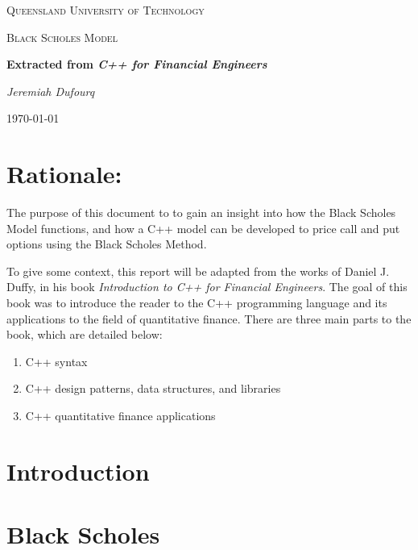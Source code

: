 \documentclass[12pt]{article}
\author{Jeremiah Dufourq}
\begin{document}
\begin{titlepage}
	\centering
	
	
	{\scshape\LARGE Queensland University of Technology \par}
	\vspace{5cm}
	{\scshape\Large Black Scholes Model\par}
	\vspace{1.5cm}
	{\huge\bfseries Extracted from \textit{C++ for Financial Engineers}\par}
	\vspace{2cm}
	{\Large\itshape Jeremiah Dufourq\par}
	
	{\large \today\par}
\end{titlepage}


\newpage
\tableofcontents
\newpage


\section{Rationale:}
The purpose of this document to to gain an insight into how the Black Scholes Model functions, and how a C++ model can be developed to price call and put options using the Black Scholes Method. 

To give some context, this report will be adapted from the works of Daniel J. Duffy, in his book \textit{Introduction to C++ for Financial Engineers}. The goal of this book was to introduce the reader to the C++ programming language and its applications to the field of quantitative finance. There are three main parts to the book, which are detailed below:

\begin{enumerate}
	\item C++ syntax 
	\item C++ design patterns, data structures, and libraries
	\item C++ quantitative finance applications
\end{enumerate}

\section{Introduction}

\section{Black Scholes}
\end{document}
